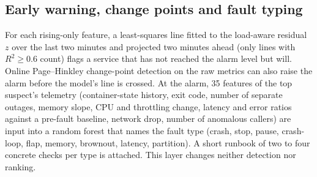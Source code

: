 \subsection{Early warning, change points and fault typing}
For each rising-only feature, a least-squares line fitted to the load-aware residual $z$ over the last two minutes and projected two minutes ahead (only lines with $R^2 \ge 0.6$ count) flags a service that has not reached the alarm level but will. Online Page--Hinkley change-point detection \cite{page1954cusum} on the raw metrics can also raise the alarm before the model's line is crossed. At the alarm, 35 features of the top suspect's telemetry (container-state history, exit code, number of separate outages, memory slope, CPU and throttling change, latency and error ratios against a pre-fault baseline, network drop, number of anomalous callers) are input into a random forest \cite{breiman2001rf} that names the fault type (crash, stop, pause, crash-loop, flap, memory, brownout, latency, partition). A short runbook of two to four concrete checks per type is attached. This layer changes neither detection nor ranking.

